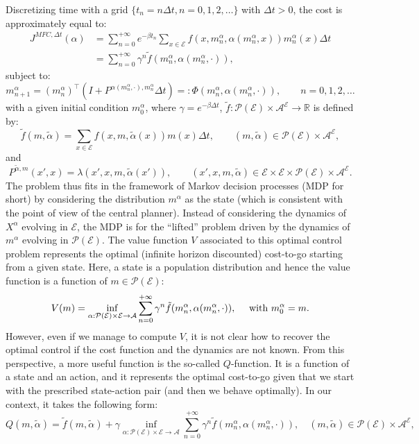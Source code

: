 \documentclass{amsproc}
\theoremstyle{definition}
\theoremstyle{remark}
\numberwithin{equation}{section}
\newcommand{\RR}{{\mathbb R}}
\newcommand{\cA}{{\mathcal A}}
\newcommand{\cE}{{\mathcal E}}
\newcommand{\cP}{{\mathcal P}}
\newcommand{\ctrl}{\alpha}
\begin{document}
Discretizing time with a grid $\{t_n = n \Delta t, n = 0,1,2,\dots\}$ with $\Delta t>0$, the cost is approximately equal to:
\begin{align*}
	J^{MFC, \Delta t}(\ctrl) 
	&= \sum_{n=0}^{+\infty} e^{-\beta t_n} \sum_{x\in\cE} f(x, m^\ctrl_n, \ctrl(m^\ctrl_n,x) ) m^\ctrl_n(x) \Delta t 
	\\
	&=  \sum_{n=0}^{+\infty} \gamma^n \tilde f(m^\ctrl_n, \ctrl(m^\ctrl_n,\cdot)),
\end{align*}
subject to:
$$
	m^\ctrl_{n+1} 
	= (m^\ctrl_{n})^\top (I + P^{\ctrl(m^\ctrl_{n},\cdot), m^\ctrl_{n}} \Delta t)
	=: \Phi(m^\ctrl_{n}, \ctrl(m^\ctrl_{n},\cdot)), \qquad n = 0, 1, 2, \dots
$$
with a given initial condition $m^\ctrl_0$, where $\gamma = e^{-\beta \Delta t}$, $\tilde f: \cP(\cE) \times \cA^{\cE} \to \RR$ is defined by:
$$
	\tilde f(m, \tilde\ctrl) = \sum_{x\in\cE} f(x, m, \tilde\ctrl(x) ) m(x) \Delta t, \qquad (m, \tilde\ctrl) \in \cP(\cE) \times \cA^\cE, 
$$
and
$$
	P^{\tilde\ctrl, m}(x', x) = \lambda(x', x, m, \tilde\ctrl(x')), \qquad (x',x,m,\tilde\ctrl) \in \cE \times \cE \times \cP(\cE) \times \cA^\cE.
$$
The problem thus fits in the framework of Markov decision processes (MDP for short) by considering the distribution $m^\ctrl$ as the state (which is consistent with the point of view of the central planner). Instead of considering the dynamics of $X^\ctrl$ evolving in $\cE$, the MDP is for the ``lifted'' problem driven by the dynamics of $m^\ctrl$ evolving in $\cP(\cE)$.  
The value function $V$ associated to this optimal control problem represents the optimal (infinite horizon discounted) cost-to-go starting from a given state. Here, a state is a population distribution and hence the value function is a function of $m \in \cP(\cE)$:
$$
	V(m) = 
	\inf_{\ctrl : \cP(\cE) \times \cE \to \cA} \sum_{n=0}^{+\infty} \gamma^n \tilde f(m^\ctrl_n, \ctrl(m^\ctrl_n,\cdot)), \quad \hbox{ with } m^\ctrl_0 = m.
$$
 However, even if we manage to compute $V$, it is not clear how to recover the optimal control if the cost function and the dynamics are not known. From this perspective, a more useful function is the so-called $Q$-function. It is a function of a state and an action, and it represents the optimal cost-to-go given that we start with the prescribed state-action pair (and then we behave optimally). In our context, it takes the following form: 
 $$
 	Q(m,\tilde\ctrl) = \tilde f(m,\tilde\ctrl) + \gamma \inf_{\ctrl : \cP(\cE) \times \cE \to \cA} \sum_{n=0}^{+\infty} \gamma^n \tilde f(m^\ctrl_n, \ctrl(m^\ctrl_n,\cdot)), \quad (m, \tilde\ctrl) \in \cP(\cE) \times \cA^{\cE},
 $$
\end{document}
